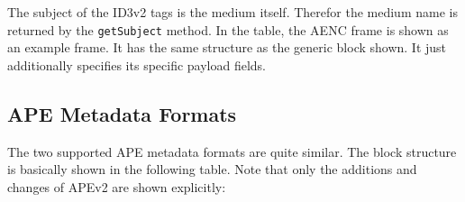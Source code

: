 
The subject of the ID3v2 tags is the medium itself. Therefor the medium name is returned by the \texttt{getSubject} method. In the table, the AENC frame is shown as an example frame. It has the same structure as the generic block shown. It just additionally specifies its specific payload fields.


\subsection{APE Metadata Formats}
\label{sec:APE}

The two supported APE metadata formats are quite similar. The block structure is basically shown in the following table. Note that only the additions and changes of APEv2 are shown explicitly:

